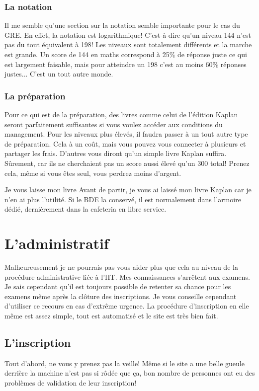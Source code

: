 \subsubsection{La notation}\label{sec:sec2.2.2.2}
Il me semble qu’une section sur la notation semble importante pour le cas du GRE. En effet, la notation est logarithmique! C’est-à-dire qu’un niveau 144 n’est pas du tout équivalent à 198! Les niveaux sont totalement différents et la marche est grande. Un score de 144 en maths correspond à 25\% de réponse juste ce qui est largement faisable, mais pour atteindre un 198 c’est au moins 60\% réponses justes... C’est un tout autre monde.

\subsubsection{La préparation}\label{sec:sec2.2.2.3}
Pour ce qui est de la préparation, des livres comme celui de l’édition Kaplan seront parfaitement suffisantes si vous voulez accéder aux conditions du management. Pour les niveaux plus élevés, il faudra passer à un tout autre type de préparation. Cela à un coût, mais vous pouvez vous connecter à plusieurs et partager les frais.
D’autres vous diront qu’un simple livre Kaplan suffira. Sûrement, car ils ne cherchaient pas un score aussi élevé qu’un 300 total! Prenez cela, même si vous êtes seul, vous perdrez moins d’argent.

\begin{example}{Je vous laisse mon livre}
  Avant de partir, je vous ai laissé mon livre Kaplan car je n'en ai plus l'utilité. Si le BDE la conservé, il est normalement dans l'armoire dédié, dernièrement dans la cafeteria en libre service.
\end{example}


\section{L’administratif}\label{sec:sec2.3}
Malheureusement je ne pourrais pas vous aider plus que cela au niveau de la procédure administrative liée à l’IIT. Mes connaissances s’arrêtent aux examens. Je sais cependant qu’il est toujours possible de retenter sa chance pour les examens même après la clôture des inscriptions. Je vous conseille cependant d’utiliser ce recours en cas d’extrême urgence. La procédure d’inscription en elle même est assez simple, tout est automatisé et le site est très bien fait.

\subsection{L’inscription}\label{sec:sec2.3.1}
Tout d’abord, ne vous y prenez pas la veille! Même si le site a une belle gueule derrière la machine n’est pas si rôdée que ça, bon nombre de personnes ont eu des problèmes de validation de leur inscription!


